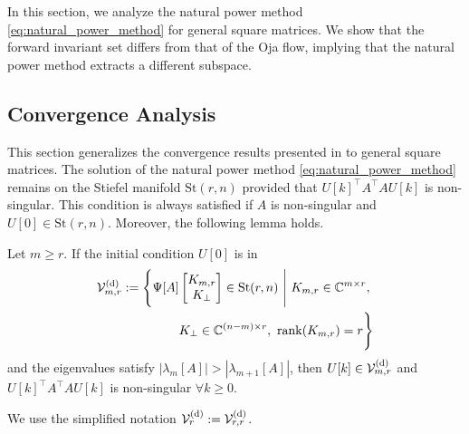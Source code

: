 \documentclass{ifacconf}
\begin{document}
In this section, we analyze the natural power method \eqref{eq:natural_power_method} for general square matrices. 
We show that the forward invariant set differs from that of the Oja flow, implying that the natural power method extracts a different subspace.

\subsection{Convergence Analysis}


This section generalizes the convergence results presented in {\cite[Appendix A]{hua1999new}} to general square matrices. The solution of the natural power method \eqref{eq:natural_power_method} remains on the Stiefel manifold $\mathrm{St}(r,n)$ provided that $U[k]^{\top} A^{\top}A U[k]$ is non-singular. This condition is always satisfied if $A$ is non-singular and $U[0] \in \mathrm{St}(r,n)$. Moreover, the following lemma holds.

\begin{lem}\label{lemma:discrete_norank_deficit}
Let $m\geq r$. If the initial condition $U[0]$ is in 
\begin{align}
    \mathcal{V}_{m,r}^{\rm (d)} := \Bigg{\{} \Psi [A] & \begin{bmatrix} K_{m,r} \\ K_{\perp} \end{bmatrix}  \in \mathrm{St}(r,n) \ \Bigg{|} \ 
    K_{m,r} \in \mathbb{C}^{m\times r},
     \nonumber \\ &
    K_{\perp} \in \mathbb{C}^{(n-m) \times r}, 
    \ \mathrm{rank}(K_{m,r}) =r \Bigg{\}}
    \label{eq:discrete_Oja_domain}
\end{align}
and the eigenvalues satisfy $| \lambda _{m}[A]| > | \lambda _{m+1}[A]|$, then $U[k] \in \mathcal{V}_{m,r}^{\rm (d)}$ and $U[k]^{\top}A^{\top}AU[k]$ is non-singular $\forall k\geq 0$.
\end{lem}

We use the simplified notation $\mathcal{V}_{r}^{\rm (d)} := \mathcal{V}_{r,r}^{\rm (d)} $.
\end{document}
